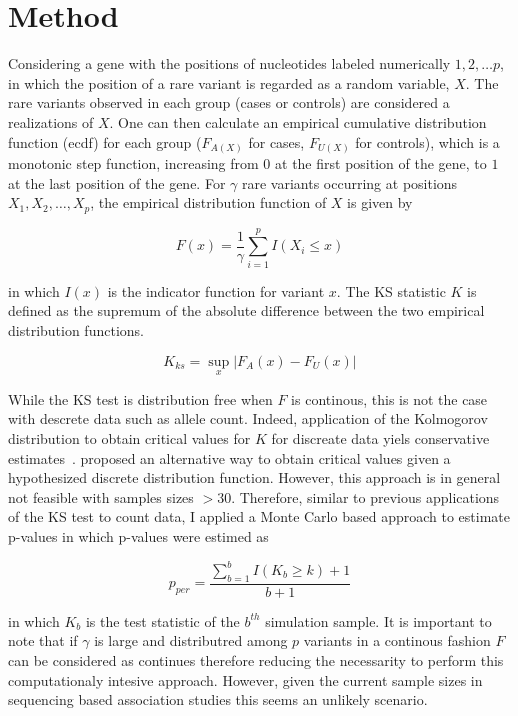 \section{Method}
\label{sec:method}

Considering a gene with the positions of nucleotides labeled numerically $1, 2, \ldots p$, in which the position of a rare variant is regarded as a random variable, $X$.
The rare variants observed in each group (cases or controls) are considered a realizations of $X$.
One can then calculate an empirical cumulative distribution function (ecdf) for each group ($F_{A(X)}$ for cases, $F_{U(X)}$ for controls), which is a monotonic step function, increasing from $0$ at the first position of the gene, to $1$ at the last position of the gene.
For $\gamma$ rare variants occurring at positions $X_1, X_2, \ldots, X_p$, the empirical distribution function of $X$ is given by

\begin{equation}
  F(x) = \frac{1}{\gamma}\sum^p_{i=1}I(X_i \leq x)
\end{equation}

in which $I(x)$ is the indicator function for variant $x$.
The KS statistic $K$ is defined as the supremum of the absolute difference between the two empirical distribution functions.

\begin{equation}
	K_{ks} = \sup_x | F_A(x) - F_U(x) |
\end{equation}

While the KS test is distribution free when $F$ is continous, this is not the case with descrete data such as allele count.
Indeed, application of the Kolmogorov distribution to obtain critical values for $K$ for discreate data yiels conservative estimates~\cite{Walsh1963,Conover1972}. 
\citet{Conover1972} proposed an alternative way to obtain critical values given a hypothesized discrete distribution function.
However, this approach is in general not feasible with samples sizes $>30$.
Therefore, similar to previous applications of the KS test to count data, I applied a Monte Carlo based approach to estimate p-values in which p-values were estimed as 

\begin{equation}
  p_{per} = \frac{\sum^b_{b=1} I(K_b \geq k)+1}{b+1}
\end{equation}

in which $K_b$ is the test statistic of the $b^{th}$ simulation sample.
It is important to note that if $\gamma$ is large and distributred among $p$ variants in a continous fashion $F$ can be considered as continues therefore reducing the necessarity to perform this computationaly intesive approach.
However, given the current sample sizes in sequencing based association studies this seems an unlikely scenario.

